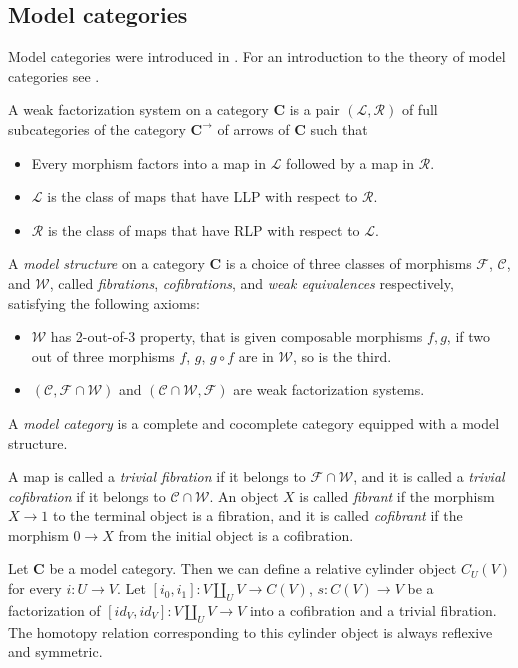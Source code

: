 \documentclass{amsart}
\theoremstyle{definition}
\newcommand{\we}{\mathcal{W}}
\newcommand{\fib}{\mathcal{F}}
\newcommand{\cof}{\mathcal{C}}
\newcommand{\cat}[1]{\mathbf{#1}}
\newcommand{\C}{\cat{C}}
\newcommand{\cyli}{i}
\begin{document}
\subsection{Model categories}

Model categories were introduced in \cite{quillen}.
For an introduction to the theory of model categories see \cite{hirschhorn,hovey}.

\begin{defn} A weak factorization system on a category $\C$ is a pair $(\mathcal{L},\mathcal{R})$
of full subcategories of the category $\C^\to$ of arrows of $\C$ such that
\begin{itemize}
\item Every morphism factors into a map in $\mathcal{L}$ followed by a map in $\mathcal{R}$.
\item $\mathcal{L}$ is the class of maps that have LLP with respect to $\mathcal{R}$.
\item $\mathcal{R}$ is the class of maps that have RLP with respect to $\mathcal{L}$.
\end{itemize}
\end{defn}

\begin{defn}
A \emph{model structure} on a category $\C$ is a choice of three classes of morphisms $\fib$, $\cof$, and $\we$,
called \emph{fibrations}, \emph{cofibrations}, and \emph{weak equivalences} respectively, satisfying the following axioms:
\begin{itemize}
\item $\we$ has 2-out-of-3 property, that is given composable morphisms $f,g$,
    if two out of three morphisms $f$, $g$, $g \circ f$ are in $\we$, so is the third.
\item $(\cof, \fib \cap \we)$ and $(\cof \cap \we, \fib)$ are weak factorization systems.
\end{itemize}
A \emph{model category} is a complete and cocomplete category equipped with a model structure.
\end{defn}

A map is called a \emph{trivial fibration} if it belongs to $\fib \cap \we$,
and it is called a \emph{trivial cofibration} if it belongs to $\cof \cap \we$.
An object $X$ is called \emph{fibrant} if the morphism $X \to 1$ to the terminal object is a fibration,
and it is called \emph{cofibrant} if the morphism $0 \to X$ from the initial object is a cofibration.

Let $\C$ be a model category.
Then we can define a relative cylinder object $C_U(V)$ for every $i : U \to V$.
Let $[\cyli_0,\cyli_1] : V \amalg_U V \to C(V)$, $s : C(V) \to V$ be a factorization of $[id_V,id_V] : V \amalg_U V \to V$ into a cofibration and a trivial fibration.
The homotopy relation corresponding to this cylinder object is always reflexive and symmetric.
\end{document}
